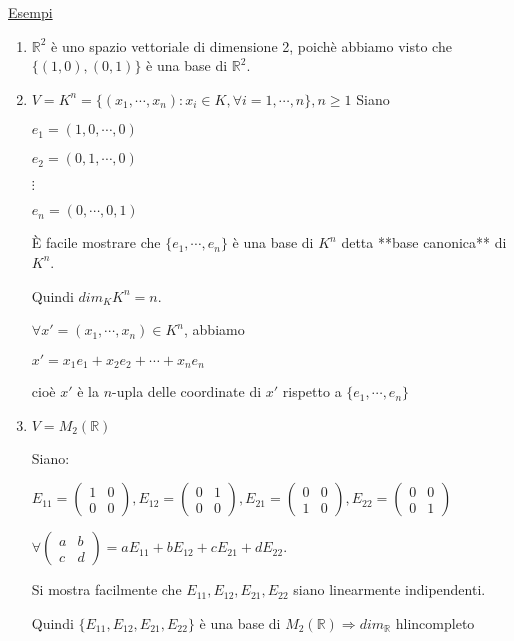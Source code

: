 \documentclass{article}
\newcommand{\ul}[1]{\underline{#1}}
\newcommand{\R}{\mathbb{R}}
\begin{document}
	\ul{Esempi}
	\begin{enumerate}
		\item $\R^2$ è uno spazio vettoriale di dimensione 2, poichè abbiamo visto che $\{(1,0),(0,1)\}$ è una base di $\R^2$.
		\item $V=K^n=\{(x_1,\cdots,x_n):x_i\in K,\forall i=1,\cdots,n\},n\ge 1$
		      Siano

		      $e_1=(1,0,\cdots,0)$

		      $e_2=(0,1,\cdots,0)$

		      $\vdots$

		      $e_n=(0,\cdots,0,1)$

		      È facile mostrare che $\{e_1,\cdots,e_n\}$ è una base di $K^n$ detta **base canonica** di $K^n$.

		      Quindi $dim_KK^n=n$.

		      $\forall x'=(x_1,\cdots,x_n)\in K^n$, abbiamo

		      $x'=x_1e_1+x_2e_2+\cdots+x_ne_n$

		      cioè $x'$ è la $n$-upla delle coordinate di $x'$ rispetto a $\{e_1,\cdots,e_n\}$
		\item $V=M_2(\R)$

		      Siano:

		      $E_{11}=\begin{pmatrix}1&0\\0&0\end{pmatrix},E_{12}=\begin{pmatrix}0&1\\0&0\end{pmatrix},E_{21}=\begin{pmatrix}0&0\\1&0\end{pmatrix},E_{22}=\begin{pmatrix}0&0\\0&1\end{pmatrix}$

		      $\forall\begin{pmatrix}a&b\\c&d\end{pmatrix}=aE_{11}+bE_{12}+cE_{21}+dE_{22}$.

		      Si mostra facilmente che $E_{11},E_{12},E_{21},E_{22}$ siano linearmente indipendenti.

		      Quindi $\{E_{11},E_{12},E_{21},E_{22}\}$ è una base di $M_2(\R)\Rightarrow dim_\R$ hl{incompleto}
	\end{enumerate}
\end{document}
